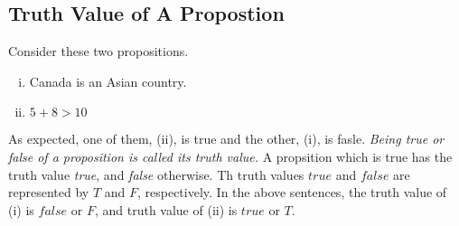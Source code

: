 \documentclass[a4paper]{article}
\theoremstyle{definition}
\theoremstyle{definition}
\theoremstyle{definition}
\theoremstyle{definition}
\theoremstyle{definition}
\theoremstyle{definition}
\begin{document}
\subsection{Truth Value of A Propostion}
Consider these two propositions.
\begin{enumerate}[i.]
    \item Canada is an Asian country.
    \item $ 5 + 8 > 10 $
\end{enumerate}
As expected, one of them, (ii), is true and the other, (i), is fasle. \textit{Being true or false of a proposition is called its truth value.} A propsition which is true has the truth value \textit{true}, and \textit{false} otherwise. Th truth values $true$ and $false$ are represented by $T$ and $F$, respectively. In the above sentences, the truth value of (i) is $false$ or $F$, and truth value of (ii) is $true$ or $T$.
\end{document}
